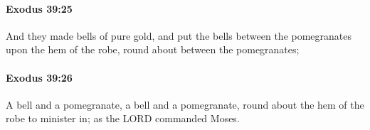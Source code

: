 		\paragraph{Exodus 39:25} %
			\label{EXODUS-39-25}

			And they made bells of pure gold, and put the bells between the pomegranates upon the hem of the robe, round about between the pomegranates;


		\paragraph{Exodus 39:26} %
			\label{EXODUS-39-26}

			A bell and a pomegranate, a bell and a pomegranate, round about the hem of the robe to minister in; as the LORD commanded Moses.


